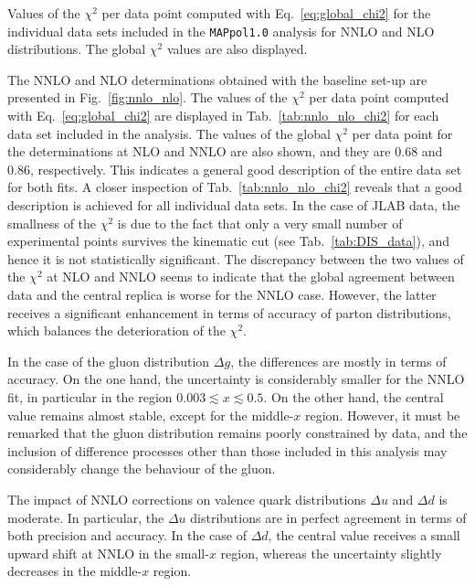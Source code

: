 \begin{table}[t!]
  \centering %
  \small
  
  \caption{
    \small
    Values of the $\chi^2$ per data point computed with Eq.~\eqref{eq:global_chi2} for the individual data sets included in the \texttt{MAPpol1.0} analysis for NNLO and NLO distributions. The global $\chi^2$ values are also displayed.  
  \label{tab:nnlo_nlo_chi2}}%
\end{table}
%
The NNLO and NLO determinations obtained with the baseline set-up are presented in Fig.~\ref{fig:nnlo_nlo}. The values of the $\chi^2$ per data point computed with Eq.~\eqref{eq:global_chi2} are displayed in Tab.~\ref{tab:nnlo_nlo_chi2} for each data set included in the analysis. The values of the global $\chi^2$ per data point for the determinations at NLO and NNLO are also shown, and they are $0.68$ and $0.86$, respectively. This indicates a general good description of the entire data set for both fits. A closer inspection of Tab.~\ref{tab:nnlo_nlo_chi2} reveals that a good description is achieved for all individual data sets. In the case of JLAB data, the smallness of the $\chi^2$ is due to the fact that only a very small number of experimental points survives the kinematic cut (see Tab.~\ref{tab:DIS_data}), and hence it is not statistically significant. The discrepancy between the two values of the $\chi^2$ at NLO and NNLO seems to indicate that the global agreement between data and the central replica is worse for the NNLO case. However, the latter receives a significant enhancement in terms of accuracy of parton distributions, which balances the deterioration of the $\chi^2$.%

In the case of the gluon distribution $\Delta g$, the differences are mostly in terms of accuracy. On the one hand, the uncertainty is considerably smaller for the NNLO fit, in particular in the region $0.003 \lesssim x \lesssim 0.5$. On the other hand, the central value remains almost stable, except for the middle-$x$ region. However, it must be remarked that the gluon distribution remains poorly constrained by data, and the inclusion of difference processes other than those included in this analysis may considerably change the behaviour of the gluon.%

The impact of NNLO corrections on valence quark distributions $\Delta u$ and $\Delta d$ is moderate. In particular, the $\Delta u$ distributions are in perfect agreement in terms of both precision and accuracy. In the case of $\Delta d$, the central value receives a small upward shift at NNLO in the small-$x$ region, whereas the uncertainty slightly decreases in the middle-$x$ region.%

